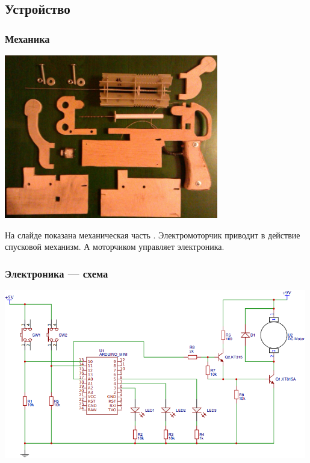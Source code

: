 \subsection{Устройство}

\begin{frame}
    \frametitle{Механика \myDevice}
    
    \begin{center}
        \includegraphics[width=0.7\textwidth]{fig/mechanics}
    \end{center}
\end{frame}

На слайде показана механическая часть {\myDevice}. Электромоторчик приводит в действие спусковой механизм. А моторчиком управляет электроника.

\begin{frame}
    \frametitle{Электроника {\myDevice} --- схема}
    
    \begin{center}
        \includegraphics[width=0.99\textwidth]{fig/eScheme}
    \end{center}
\end{frame}

